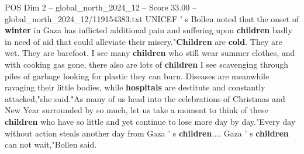 \begin{textsample}{POS Dim 2 – global\_north\_2024\_12 – Score 33.00 – global\_north\_2024\_12/119154383.txt}
UNICEF ' s Bollen noted that the onset of \textbf{winter} in Gaza has inflicted additional pain and suffering upon \textbf{children} badly in need of aid that could alleviate their misery."\textbf{Children} are \textbf{cold}.
They are wet.
They are barefoot.
I see many \textbf{children} who still wear summer clothes, and with cooking gas gone, there also are lots of \textbf{children} I see scavenging through piles of garbage looking for plastic they can burn.
Diseases are meanwhile ravaging their little bodies, while \textbf{hospitals} are destitute and constantly attacked,"she said."As many of us head into the celebrations of Christmas and New Year surrounded by so much, let us take a moment to think of these \textbf{children} who have so little and yet continue to lose more day by day."Every day without action steals another day from Gaza ' s \textbf{children}....
Gaza ' s \textbf{children} can not wait,"Bollen said.

\end{textsample}
